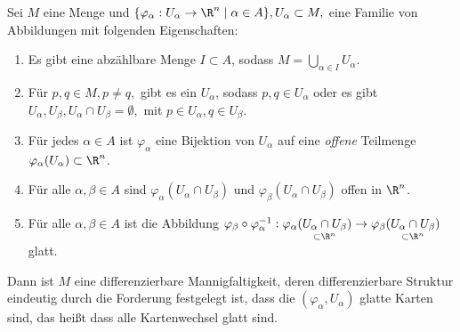 \begin{lem}\label{1.14}
	Sei $M$ eine Menge und $ \{\varphi_\alpha: U_\alpha \to \R^n \mid \alpha \in A\}, U_\alpha \subset M, $ eine Familie von Abbildungen mit folgenden Eigenschaften:
	\begin{enumerate}[label={\roman*})]
		\item Es gibt eine abzählbare Menge $ I \subset A $, sodass $ M = \bigcup\limits_{\alpha \in I}U_\alpha. $
		\item Für $ p,q \in M, p \neq q, $ gibt es ein $ U_\alpha $, sodass $ p,q \in U_\alpha $ oder es gibt $ U_\alpha,U_\beta, U_\alpha \cap U_\beta = \emptyset, $ mit $ p \in U_\alpha, q \in U_\beta. $
		\item Für jedes $ \alpha \in A $ ist $ \varphi_\alpha $ eine Bijektion von $ U_\alpha $ auf eine \emph{offene} Teilmenge $ \varphi_\alpha(U_\alpha) \subset \R^n $.
		\item Für alle $ \alpha,\beta \in A $ sind $ \varphi_\alpha(U_\alpha \cap U_\beta) $ und $ \varphi_\beta(U_\alpha \cap U_\beta) $ offen in $\R^n$.
		\item Für alle $ \alpha,\beta \in A $ ist die Abbildung $ \varphi_\beta \circ \varphi_\alpha^{-1}: \varphi_\alpha( \underset{\subset \R^n}{U_\alpha \cap U_\beta} ) \to \varphi_\beta( \underset{\subset \R^n}{U_\alpha \cap U_\beta} ) $ glatt.
	\end{enumerate}
	Dann ist $M$ eine differenzierbare Mannigfaltigkeit, deren differenzierbare Struktur eindeutig durch die Forderung festgelegt ist, dass die $ (\varphi_\alpha,U_\alpha) $ glatte Karten sind, das heißt dass alle Kartenwechsel glatt sind.
\end{lem}